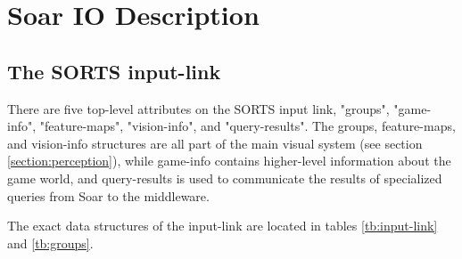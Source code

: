 
\section{Soar IO Description}

\subsection{The SORTS input-link}

There are five top-level attributes on the SORTS input link, "groups", "game-info", "feature-maps", "vision-info", and "query-results". The groups, feature-maps, and vision-info structures are all part of the main visual system (see section \ref{section:perception}), while game-info contains higher-level information about the game world, and query-results is used to communicate the results of specialized queries from Soar to the middleware.

The exact data structures of the input-link are located in tables \ref{tb:input-link} and \ref{tb:groups}.

